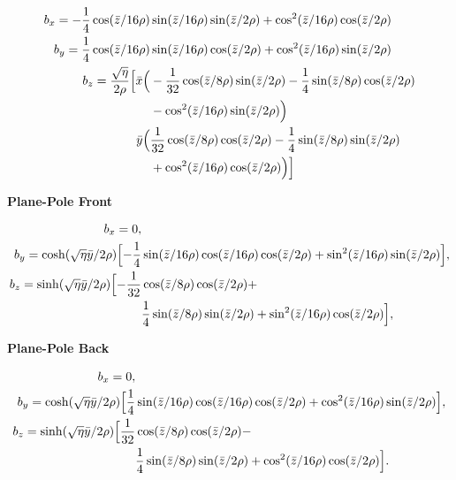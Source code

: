 \documentclass[12pt]{article}%
\begin{document}
\begin{align}
b_x  =  -\frac{1}{4}\cos(\bar{z}/16\rho) & \sin(\bar{z}/16\rho)    \sin(\bar{z}/2\rho)   +   \cos^2(\bar{z} / 16\rho)  \cos(\bar{z}/2\rho)  \\
b_y =  \frac{1}{4}\cos(\bar{z}/16\rho) & \sin(\bar{z}/16\rho)    \cos(\bar{z}/2\rho)   +  \cos^2(\bar{z} / 16\rho)  \sin(\bar{z}/2\rho)\\
b_z = \frac{\sqrt{\eta}}{2\rho} \Bigl[   \bar{x}\Bigl(& -\frac{1}{32}\cos( \bar{z}/8\rho )\sin(\bar{z}/2\rho) -
           \frac{1}{4}\sin(\bar{z}/8\rho)\cos(\bar{z}/2\rho) \nonumber  \\
           & - \cos^2(\bar{z}/16\rho)\sin(\bar{z}/2\rho) \Bigr) \nonumber \\
           \bar{y}\Bigl(& \frac{1}{32}\cos( \bar{z}/8\rho )\cos(\bar{z}/2\rho) - \frac{1}{4}\sin(\bar{z}/8\rho)\sin(\bar{z}/2\rho) \nonumber  \\
           & + \cos^2(\bar{z}/16\rho)\cos(\bar{z}/2\rho) \Bigr)  \Bigr]
\end{align}



{\bf Plane-Pole Front}

\begin{align}
b_x  =  0,  &    \\
b_y   = \cosh(\sqrt{\eta}\bar{y} / 2\rho)\Bigl[ -\frac{1}{4}& \sin(\bar{z}/16\rho) \cos(\bar{z}/16\rho) \cos(\bar{z} / 2\rho) +   \sin^2(\bar{z}/16\rho) \sin(\bar{z} / 2\rho)   \Bigr], \\
b_z  =  \sinh(\sqrt{\eta}\bar{y} / 2\rho) \Bigl[ -\frac{1}{32} & \cos(\bar{z}/8\rho) \cos(\bar{z}/2\rho) + \nonumber \\
                                                &\frac{1}{4}  \sin(\bar{z}/8\rho)\sin(\bar{z}/2\rho) + \sin^2  (\bar{z}/16\rho) \cos(\bar{z}/2\rho)  \Bigr],
\end{align}

{\bf Plane-Pole Back}

\begin{align}
b_x  =  0,  &    \\
b_y   = \cosh(\sqrt{\eta}\bar{y} / 2\rho)\Bigl[ \frac{1}{4}& \sin(\bar{z}/16\rho) \cos(\bar{z}/16\rho) \cos(\bar{z} / 2\rho) +   \cos^2(\bar{z}/16\rho) \sin(\bar{z} / 2\rho)   \Bigr], \\
b_z  =  \sinh(\sqrt{\eta}\bar{y} / 2\rho) \Bigl[ \frac{1}{32} & \cos(\bar{z}/8\rho) \cos(\bar{z}/2\rho) - \nonumber \\
                                                &\frac{1}{4}  \sin(\bar{z}/8\rho)\sin(\bar{z}/2\rho) + \cos^2  (\bar{z}/16\rho) \cos(\bar{z}/2\rho)  \Bigr].
\end{align}
\end{document}
